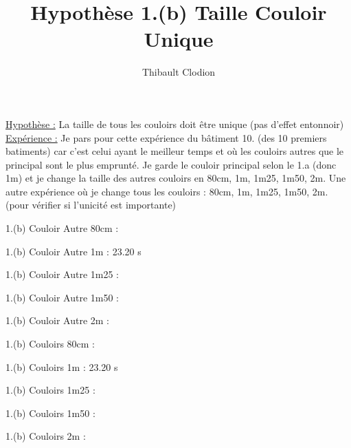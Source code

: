 \documentclass[12pt]{article}
\title{Hypothèse 1.(b) Taille Couloir Unique}
\author{Thibault Clodion}
\begin{document}
\maketitle %

\underline{Hypothèse :} La taille de tous les couloirs doit être unique (pas d'effet entonnoir)
\newline\newline
\underline{Expérience :} Je pars pour cette expérience du bâtiment 10. (des 10 premiers batiments) car c'est celui ayant le meilleur temps et où les couloirs autres que le principal sont le plus emprunté.
\newline\newline
Je garde le couloir principal selon le 1.a (donc 1m) et je change la taille des autres couloirs en 80cm, 1m, 1m25, 1m50, 2m.
\newline
Une autre expérience où je change tous les couloirs : 80cm, 1m, 1m25, 1m50, 2m. (pour vérifier si l'unicité est importante)
\newline\newline

1.(b) Couloir Autre 80cm :
\newline\newline

1.(b) Couloir Autre 1m : 23.20 s
\newline\newline

1.(b) Couloir Autre 1m25 :
\newline\newline

1.(b) Couloir Autre 1m50 :
\newline\newline

1.(b) Couloir Autre 2m :
\newline\newline

1.(b) Couloirs 80cm :
\newline\newline

1.(b) Couloirs 1m : 23.20 s
\newline\newline

1.(b) Couloirs 1m25 :
\newline\newline

1.(b) Couloirs 1m50 :
\newline\newline

1.(b) Couloirs 2m :
\newline\newline
\end{document}
